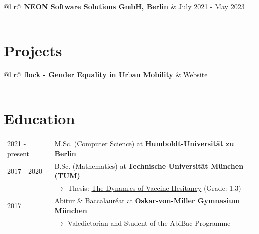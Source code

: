 \documentclass[a4paper,12pt]{article}
\begin{document}
\begin{tabularx}{\linewidth}{ @{}l r@{} }
\textbf{NEON Software Solutions GmbH, Berlin} & \hfill July 2021 - May 2023 \\[3.75pt]
  \\
\end{tabularx}

\section{Projects}

\begin{tabularx}{\linewidth}{ @{}l r@{} }
\textbf{flock - Gender Equality in Urban Mobility} & \hfill \href{https://the-flock.org/}{Website} \\[3.75pt]
  \\
\end{tabularx}

\section{Education}
\begin{tabularx}{\linewidth}{@{}l X@{}}	
2021 - present & M.Sc. (Computer Science) at \textbf{Humboldt-Universität zu Berlin} \hfill \normalsize \\

2017 - 2020 & B.Sc. (Mathematics) at \textbf{Technische Universität München (TUM)}\hfill \\ 
&\phantom{ }$\rightarrow$ Thesis: \href{https://julienandco.github.io/the-dynamics-of-vaccine-hesitancy/bachelor_thesis_julien_caselmann.pdf}{The Dynamics of Vaccine Hesitancy} (Grade: 1.3) \\
2017 & Abitur \& Baccalauréat at \textbf{Oskar-von-Miller Gymnasium München} \hfill \\
&\phantom{ }$\rightarrow$ Valedictorian and Student of the AbiBac Programme
\end{tabularx}
\end{document}
